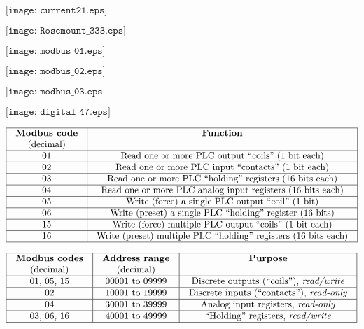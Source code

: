 \documentclass[12pt,a4paper,margin=2cm]{book}
\def\lthtmlcheckvsize{\ifdim\ht\sizebox<\vsize 
  \ifdim\wd\sizebox<\hsize\expandafter\hfill\fi \expandafter\vfill
  \else\expandafter\vss\fi}%
\begin{document}
{\newpage\clearpage
{}%
$\displaystyle \texttt{[image: current21.eps]}$%
\lthtmlindisplaymathZ
\lthtmlcheckvsize\clearpage}

{\newpage\clearpage
{}%
$\displaystyle \texttt{[image: Rosemount\_333.eps]}$%
\lthtmlindisplaymathZ
\lthtmlcheckvsize\clearpage}

{\newpage\clearpage
{}%
$\displaystyle \texttt{[image: modbus\_01.eps]}$%
\lthtmlindisplaymathZ
\lthtmlcheckvsize\clearpage}

{\newpage\clearpage
{}%
$\displaystyle \texttt{[image: modbus\_02.eps]}$%
\lthtmlindisplaymathZ
\lthtmlcheckvsize\clearpage}

{\newpage\clearpage
{}%
$\displaystyle \texttt{[image: modbus\_03.eps]}$%
\lthtmlindisplaymathZ
\lthtmlcheckvsize\clearpage}

{\newpage\clearpage
{}%
$\displaystyle \texttt{[image: digital\_47.eps]}$%
\lthtmlindisplaymathZ
\lthtmlcheckvsize\clearpage}

{\newpage\clearpage
{}%
$\displaystyle \vbox{\offinterlineskip
\halign{\strut
\vrule \quad\hfil # \  \hfil & 
\vrule \quad\hfil # \  \hfil \vrule \cr
\noalign{\hrule }
\textbf{Modbus code} & \textbf{Function} \cr
(decimal) &  \cr
\noalign{\hrule }
01 & Read one or more PLC output ``coils'' (1 bit each) \cr
\noalign{\hrule }
02 & Read one or more PLC input ``contacts'' (1 bit each) \cr
\noalign{\hrule }
03 & Read one or more PLC ``holding'' registers (16 bits each) \cr
\noalign{\hrule }
04 & Read one or more PLC analog input registers (16 bits each) \cr
\noalign{\hrule }
05 & Write (force) a single PLC output ``coil'' (1 bit) \cr
\noalign{\hrule }
06 & Write (preset) a single PLC ``holding'' register (16 bits) \cr
\noalign{\hrule }
15 & Write (force) multiple PLC output ``coils'' (1 bit each) \cr
\noalign{\hrule }
16 & Write (preset) multiple PLC ``holding'' registers (16 bits each) \cr
\noalign{\hrule }
} %
}$%
\lthtmlindisplaymathZ
\lthtmlcheckvsize\clearpage}

{\newpage\clearpage
{}%
$\displaystyle \vbox{\offinterlineskip
\halign{\strut
\vrule \quad\hfil # \  \hfil & 
\vrule \quad\hfil # \  \hfil & 
\vrule \quad\hfil # \  \hfil \vrule \cr
\noalign{\hrule }
\textbf{Modbus codes} & \textbf{Address range} & \textbf{Purpose} \cr
(decimal) & (decimal) & \cr
\noalign{\hrule }
01, 05, 15 & 00001 to 09999 & Discrete outputs (``coils''), \textit{read/write} \cr
\noalign{\hrule }
02 & 10001 to 19999 & Discrete inputs (``contacts''), \textit{read-only} \cr
\noalign{\hrule }
04 & 30001 to 39999 & Analog input registers, \textit{read-only} \cr
\noalign{\hrule }
03, 06, 16 & 40001 to 49999 & ``Holding'' registers, \textit{read/write} \cr
\noalign{\hrule }
} %
}$%
\lthtmlindisplaymathZ
\lthtmlcheckvsize\clearpage}
\end{document}
